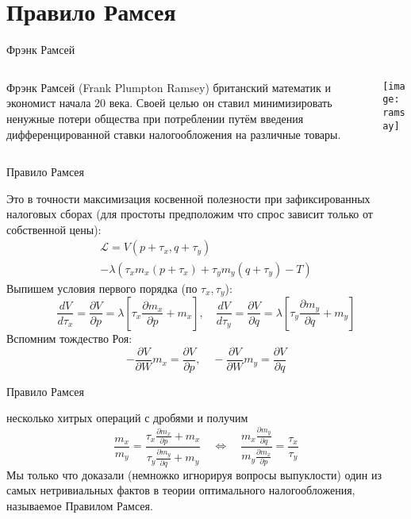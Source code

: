 \documentclass{beamer}
\begin{document}
\section{Правило Рамсея}

\begin{frame}{Фрэнк Рамсей}
\begin{columns}
\begin{column}{0.5\textwidth}
   \alert{Фрэнк Рамсей} (Frank Plumpton Ramsey) британский математик и экономист начала 20 века. Своей целью он ставил \alert{минимизировать ненужные потери общества} при потреблении путём введения \alert{дифференцированной ставки налогообложения} на различные товары. 
\end{column}
\begin{column}{0.5\textwidth}  %
    \begin{center}
     \texttt{[image: ramsay]}
     \end{center}
\end{column}
\end{columns}
\end{frame}

\begin{frame}{Правило Рамсея}

Это в точности максимизация косвенной полезности при зафиксированных налоговых сборах (для простоты предположим что спрос зависит только от собственной цены):
\begin{gather*}
\mathcal{L} = V(p+\tau_x,q+\tau_y) \\ - \lambda (\tau_x m_x(p+ \tau_x) + \tau_y m_y(q+\tau_y) - T)
\end{gather*}
Выпишем условия первого порядка (по $\tau_x, \tau_y$):
$$\frac{d V}{d \tau_x} = \frac{\partial V}{\partial p} = \lambda [\tau_x \frac{\partial m_x}{\partial p} + m_x], \quad \frac{d V}{d \tau_y} = \frac{\partial V}{\partial q} = \lambda [\tau_y \frac{\partial m_y}{\partial q}+m_y]$$
Вспомним тождество Роя:
$$-\frac{\partial V}{\partial W}m_x = \frac{\partial V}{\partial p}, \quad -\frac{\partial V}{\partial W}m_y = \frac{\partial V}{\partial q}$$
\end{frame}

\begin{frame}{Правило Рамсея}

несколько хитрых операций с дробями и получим
$$ \frac{m_x}{m_y} = \frac{\tau_x \frac{\partial m_x}{\partial p} + m_x}{\tau_y \frac{\partial m_y}{\partial q}+m_y} \quad \Leftrightarrow \quad \frac{m_x \frac{\partial m_y}{\partial q}}{m_y \frac{\partial m_x}{\partial p}} = \frac{\tau_x}{\tau_y}$$
Мы только что доказали (немножко игнорируя вопросы выпуклости) один из самых нетривиальных фактов в теории оптимального налогообложения, называемое Правилом Рамсея.

\end{frame}
\end{document}
